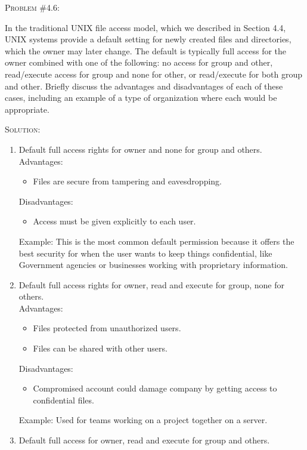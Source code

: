 \documentclass[12pt]{article}
\newenvironment{problem}[1]
{\begin{mdframed}[linewidth=0.8pt]
        \textsc{Problem #1:}

}
    {\end{mdframed}}
\newenvironment{solution}
    {\textsc{Solution:}\\}
    {\newpage}%
\begin{document}
	\begin{problem}{\#4.6}
		In the traditional UNIX file access model, which we described in Section 4.4, UNIX
		systems provide a default setting for newly created files and directories, which
		the owner may later change. The default is typically full access for the owner 
		combined with one of the following: no access for group and other, read/execute
		access for group and none for other, or read/execute for both group and other.
		Briefly discuss the advantages and disadvantages of each of these cases, including
		an example of a type of organization where each would be appropriate.
	\end{problem}
	\begin{solution}
		\begin{enumerate}
			\item Default full access rights for owner and none for group and others.\\
				Advantages:
				\begin{itemize}
					\item Files are secure from tampering and eavesdropping.
				\end{itemize}
				Disadvantages:
				\begin{itemize}
					\item Access must be given explicitly to each user.
				\end{itemize}
				Example: This is the most common default permission because it
				offers the best security for when the user wants to keep things confidential,
				like Government agencies or businesses working with proprietary information.
			\item Default full access rights for owner, read and execute for group, none for others.\\
				Advantages:
				\begin{itemize}
					\item Files protected from unauthorized users.
					\item Files can be shared with other users.
				\end{itemize}
				Disadvantages:
				\begin{itemize}
					\item Compromised account could damage company by
						getting access to confidential files.
				\end{itemize}
				Example: Used for teams working on a project together on a server.
			\item Default full access for owner, read and execute for group and others.\\

\end{enumerate}
\end{solution}
\end{document}
